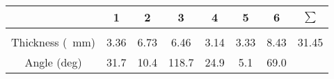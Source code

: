 \documentclass{standalone}
\begin{document}
    \begin{tabular}{c c c c c c c c}
        \toprule
        & 1 & 2 & 3 & 4 & 5 & 6 & $\sum$ \\ 
        \midrule\\
        \addlinespace[-2ex]
        Thickness (\SI{}{\milli \meter}) & 3.36 & 6.73 & 6.46 & 3.14 & 3.33 & 8.43 & 31.45 \\
        \addlinespace[1.5ex]
        Angle (deg) & 31.7 & 10.4 & 118.7 & 24.9 & 5.1 & 69.0 \\
        \bottomrule
    \end{tabular}
\end{document}

